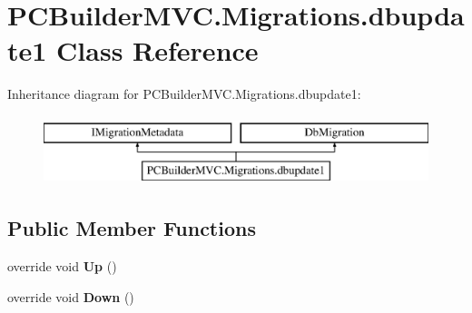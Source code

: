 \hypertarget{class_p_c_builder_m_v_c_1_1_migrations_1_1dbupdate1}{}\section{P\+C\+Builder\+M\+V\+C.\+Migrations.\+dbupdate1 Class Reference}
\label{class_p_c_builder_m_v_c_1_1_migrations_1_1dbupdate1}
Inheritance diagram for P\+C\+Builder\+M\+V\+C.\+Migrations.\+dbupdate1\+:\begin{figure}[H]
\begin{center}
\leavevmode
\includegraphics[height=2.000000cm]{class_p_c_builder_m_v_c_1_1_migrations_1_1dbupdate1}
\end{center}
\end{figure}
\subsection*{Public Member Functions}
\begin{DoxyCompactItemize}
\item 
override void {\bfseries Up} ()\hypertarget{class_p_c_builder_m_v_c_1_1_migrations_1_1dbupdate1_a1f02ce7d271ad7cdae7162c82dd946fb}{}\label{class_p_c_builder_m_v_c_1_1_migrations_1_1dbupdate1_a1f02ce7d271ad7cdae7162c82dd946fb}

\item 
override void {\bfseries Down} ()\hypertarget{class_p_c_builder_m_v_c_1_1_migrations_1_1dbupdate1_ac88cfe63fdfe3dc33eaabe795ac754d3}{}\label{class_p_c_builder_m_v_c_1_1_migrations_1_1dbupdate1_ac88cfe63fdfe3dc33eaabe795ac754d3}

\end{DoxyCompactItemize}
